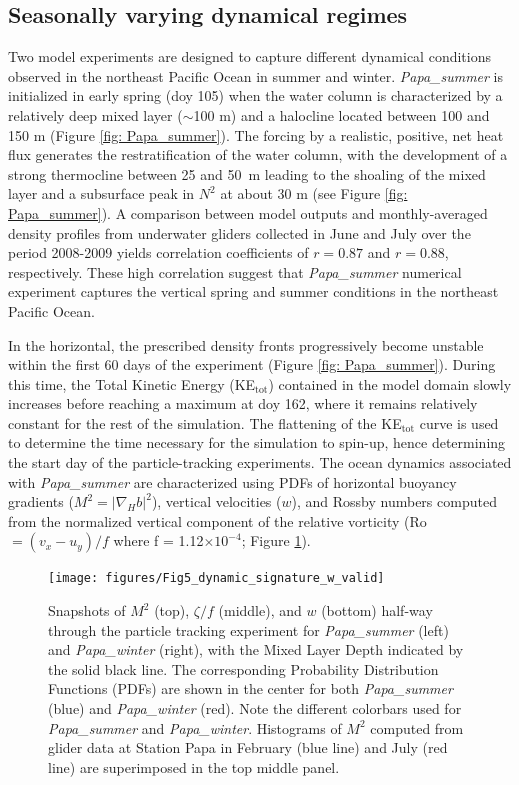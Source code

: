 \documentclass[draft,linenumbers]{agujournal2018}
\begin{document}
\subsection{Seasonally varying dynamical regimes}

Two model experiments are designed to capture different dynamical conditions observed in the northeast Pacific Ocean in summer and winter. \textit{Papa\_summer} is initialized in early spring (doy 105) when the water column is characterized by a relatively deep mixed layer ($\sim$100 m) and a halocline located between 100 and 150 m (Figure \ref{fig: Papa_summer}). The forcing by a realistic, positive, net heat flux generates the restratification of the water column, with the development of a strong thermocline between 25 and 50~m leading to the shoaling of the mixed layer and a subsurface peak in $N^2$ at about 30 m (see Figure \ref{fig: Papa_summer}). A comparison between model outputs and monthly-averaged density profiles from underwater gliders collected in June and July over the period 2008-2009 yields correlation coefficients of $r = 0.87$ and $r = 0.88$, respectively. These high correlation suggest that \textit{Papa\_summer} numerical experiment captures the vertical spring and summer conditions in the northeast Pacific Ocean.

In the horizontal, the prescribed density fronts progressively become unstable within the first 60 days of the experiment (Figure \ref{fig: Papa_summer}). During this time, the Total Kinetic Energy (KE$_{\text{tot}}$) contained in the model domain slowly increases before reaching a maximum at doy 162, where it remains relatively constant for the rest of the simulation. The flattening of the KE$_{\text{tot}}$ curve is used to determine the time necessary for the simulation to spin-up, hence determining the start day of the particle-tracking experiments. The ocean dynamics associated with \textit{Papa\_summer} are characterized using PDFs of horizontal buoyancy gradients ($M^2 = |\nabla_Hb|^2$), vertical velocities ($w$), and Rossby numbers computed from the normalized vertical component of the relative vorticity (Ro $=(v_x - u_y)/f$ where f = 1.12$\times10^{-4}$; Figure \ref{fig: dynamics}).

\begin{figure}[t]
	\centering
	\texttt{[image: figures/Fig5\_dynamic\_signature\_w\_valid]}
	\caption{Snapshots of $M^2$ (top), $\zeta /f$ (middle), and $w$ (bottom) half-way through the particle tracking experiment for \textit{Papa\_summer} (left) and \textit{Papa\_winter} (right), with the Mixed Layer Depth indicated by the solid black line. The corresponding Probability Distribution Functions (PDFs) are shown in the center for both \textit{Papa\_summer} (blue) and \textit{Papa\_winter} (red). Note the different colorbars used for \textit{Papa\_summer} and \textit{Papa\_winter}. Histograms of $M^2$ computed from glider data at Station Papa in February (blue line) and July (red line) are superimposed in the top middle panel.}
	\label{fig: dynamics}
\end{figure}
\end{document}
